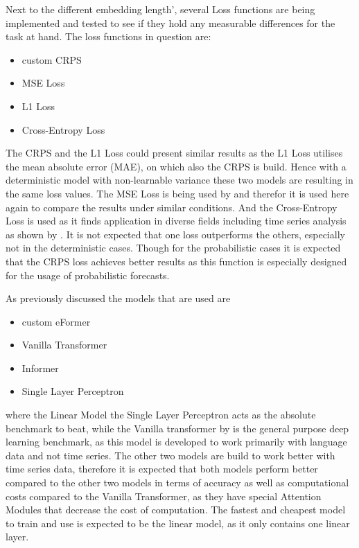 \documentclass{article}
\begin{document}
Next to the different embedding length', several Loss functions are being implemented and tested to see if they hold any measurable differences for the task at hand. The loss functions in question are:
\begin{multicols}{2}
\begin{itemize}
    \item custom CRPS
    \item MSE Loss
    \item L1 Loss
    \item Cross-Entropy Loss
\end{itemize}    
\end{multicols}
The CRPS and the L1 Loss could present similar results as the L1 Loss utilises the mean absolute error (MAE), on which also the CRPS is build. Hence with a deterministic model with non-learnable variance these two models are resulting in the same loss values. The MSE Loss is being used by \cite{Informer, autoformer} and therefor it is used here again to compare the results under similar conditions. And the Cross-Entropy Loss is used as it finds application in diverse fields including time series analysis as shown by \cite{cross-entropy_time-series}. It is not expected that one loss outperforms the others, especially not in the deterministic cases. Though for the probabilistic cases it is expected that the CRPS loss achieves better results as this function is especially designed for the usage of probabilistic forecasts. 

As previously discussed the models that are used are 
\begin{multicols}{2}
\begin{itemize}
    \item custom eFormer
    \item Vanilla Transformer
    \item Informer
    \item Single Layer Perceptron
\end{itemize}
\end{multicols}
where the Linear Model the Single Layer Perceptron acts as the absolute benchmark to beat, while the Vanilla transformer by \cite{vanilla-transformer} is the general purpose deep learning benchmark, as this model is developed to work primarily with language data and not time series. The other two models are build to work better with time series data, therefore it is expected that both models perform better compared to the other two models in terms of accuracy as well as computational costs compared to the Vanilla Transformer, as they have special Attention Modules that decrease the cost of computation. The fastest and cheapest model to train and use is expected to be the linear model, as it only contains one linear layer.
\end{document}
